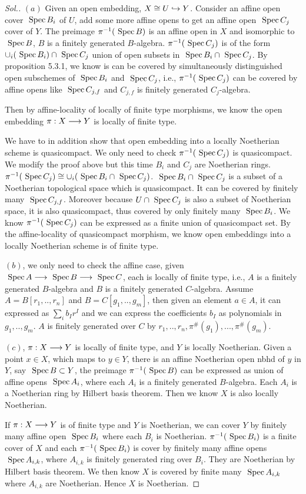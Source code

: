 \documentclass[11pt]{book} %
\begin{document}
 \begin{proof}[Sol.]
 $(a)$ Given an open embedding, $X\cong U\hookrightarrow Y$. Consider an affine open cover $\text{ Spec\,} B_i$ of $U$, add some more affine opens to get an affine open $\text{ Spec\,} C_j$ cover of $Y$. The preimage $\pi^{-1}(\text{ Spec\,} B)$ is an affine open in $X$ and isomorphic to $\text{ Spec\,} B$, $B$ is a finitely generated $B$-algebra. $\pi^{-1}(\text{ Spec\,} C_j)$ is of the form $\cup_i(\text{ Spec\,} B_i)\cap \text{ Spec\,} C_j$ union of open subsets in $\text{ Spec\,} B_i\cap \text{ Spec\,} C_j$.  By proposition 5.3.1, we know is can be covered by simultaneously distinguished open subschemes of $\text{ Spec\,} B_i$ and $\text{ Spec\,} C_j$, i.e., $\pi^{-1}(\text{ Spec\,} C_j)$ can be covered by affine opens like $\text{ Spec\,} C_{j,f}$ and $C_{j,f}$ is finitely generated $C_j$-algebra.

Then by affine-locality of locally of finite type morphisms, we know the open embedding $\pi:X\longrightarrow Y$ is locally of finite type.


We have to in addition show that open embedding into a locally Noetherian scheme is quasicompact. We only need to check $\pi^{-1}(\text{ Spec\,} C_j)$ is quasicompact. We modify the proof above but this time $B_i$ and $C_j$ are Noetherian rings. $\pi^{-1}(\text{ Spec\,} C_j)\cong \cup_i(\text{ Spec\,} B_i\cap \text{ Spec\,} C_j)$. $\text{ Spec\,} B_i\cap \text{ Spec\,} C_j$ is a subset of a Noetherian topological space which is quasicompact. It can be covered by finitely many $\text{ Spec\,} C_{j,f}$. Moreover because $U\cap \text{ Spec\,} C_j$ is also a subset of Noetherian space, it is also quasicompact, thus covered by only finitely many $\text{ Spec\,} B_i$. We know $\pi^{-1}(\text{ Spec\,} C_j)$ can be expressed as a finite union of quasicompact set.  By the affine-locality of quasicompact morphism, we know open embeddings into  a locally Noetherian scheme is of finite type.

$(b)$, we only need to check the affine case, given $\text{ Spec\,} A\longrightarrow \text{ Spec\,} B\longrightarrow \text{ Spec\,} C$,  each is locally of finite type, i.e., $A$ is a finitely generated $B$-algebra and $B$ is a finitely generated $C$-algebra.
Assume $A=B[r_1,..,r_n]$ and $B=C[g_1,..,g_m]$, then given an element $a\in A$, it can expressed as $\sum_i b_I r^I$ and we can express the coefficients $b_I$ as polynomials in $g_1,..,g_m$. $A$ is finitely generated over $C$ by $r_1,..,r_n, \pi^{\#}(g_1),...,\pi^{\#}(g_m)$.

$(c)$, $\pi:X\longrightarrow Y$ is locally of finite type, and $Y$ is locally Noetherian. Given a point $x\in X$, which maps to $y\in Y$, there is an affine Noetherian open nbhd of $y$ in $Y$, say $\text{ Spec\,} B\subset Y$, the preimage $\pi^{-1}(\text{ Spec\,} B)$ can be expressed as union of affine opens $\text{ Spec\,} A_i$, where each $A_i$ is a finitely generated $B$-algebra. Each $A_i$ is a Noetherian ring by Hilbert basis theorem. Then we know $X$ is also locally Noetherian. 

If $\pi:X\longrightarrow Y$ is of finite type and $Y$ is Noetherian, we can cover $Y$ by finitely many affine open $\text{ Spec\,} B_i$ where each $B_i$ is Noetherian. $\pi^{-1}(\text{ Spec\,} B_i)$ is a finite cover of $X$ and each $\pi^{-1}(\text{ Spec\,} B_i)$ is cover by finitely many affine opens $\text{ Spec\,} A_{i,k}$, where $A_{i,k}$ is finitely generated ring over $B_i$. They are Noetherian by Hilbert basis theorem. We then know $X$ is covered by finite many $\text{ Spec\,} A_{i,k}$ where $A_{i,k}$ are Noetherian. Hence $X$ is Noetherian. 
 \end{proof}
\end{document}
